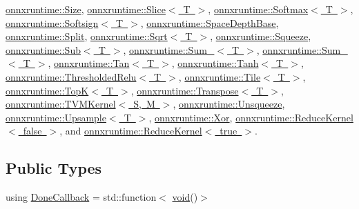 \mbox{\hyperlink{classonnxruntime_1_1Size}{onnxruntime\+::\+Size}}, \mbox{\hyperlink{structonnxruntime_1_1Slice}{onnxruntime\+::\+Slice$<$ T $>$}}, \mbox{\hyperlink{classonnxruntime_1_1Softmax}{onnxruntime\+::\+Softmax$<$ T $>$}}, \mbox{\hyperlink{classonnxruntime_1_1Softsign}{onnxruntime\+::\+Softsign$<$ T $>$}}, \mbox{\hyperlink{classonnxruntime_1_1SpaceDepthBase}{onnxruntime\+::\+Space\+Depth\+Base}}, \mbox{\hyperlink{classonnxruntime_1_1Split}{onnxruntime\+::\+Split}}, \mbox{\hyperlink{classonnxruntime_1_1Sqrt}{onnxruntime\+::\+Sqrt$<$ T $>$}}, \mbox{\hyperlink{classonnxruntime_1_1Squeeze}{onnxruntime\+::\+Squeeze}}, \mbox{\hyperlink{classonnxruntime_1_1Sub}{onnxruntime\+::\+Sub$<$ T $>$}}, \mbox{\hyperlink{classonnxruntime_1_1Sum__6}{onnxruntime\+::\+Sum\+\_$<$ T $>$}}, \mbox{\hyperlink{classonnxruntime_1_1Sum__8}{onnxruntime\+::\+Sum\+\_$<$ T $>$}}, \mbox{\hyperlink{classonnxruntime_1_1Tan}{onnxruntime\+::\+Tan$<$ T $>$}}, \mbox{\hyperlink{classonnxruntime_1_1Tanh}{onnxruntime\+::\+Tanh$<$ T $>$}}, \mbox{\hyperlink{classonnxruntime_1_1ThresholdedRelu}{onnxruntime\+::\+Thresholded\+Relu$<$ T $>$}}, \mbox{\hyperlink{structonnxruntime_1_1Tile}{onnxruntime\+::\+Tile$<$ T $>$}}, \mbox{\hyperlink{classonnxruntime_1_1TopK}{onnxruntime\+::\+Top\+K$<$ T $>$}}, \mbox{\hyperlink{classonnxruntime_1_1Transpose}{onnxruntime\+::\+Transpose$<$ T $>$}}, \mbox{\hyperlink{classonnxruntime_1_1TVMKernel}{onnxruntime\+::\+T\+V\+M\+Kernel$<$ S, M $>$}}, \mbox{\hyperlink{classonnxruntime_1_1Unsqueeze}{onnxruntime\+::\+Unsqueeze}}, \mbox{\hyperlink{classonnxruntime_1_1Upsample}{onnxruntime\+::\+Upsample$<$ T $>$}}, \mbox{\hyperlink{classonnxruntime_1_1Xor}{onnxruntime\+::\+Xor}}, \mbox{\hyperlink{classonnxruntime_1_1ReduceKernel}{onnxruntime\+::\+Reduce\+Kernel$<$ false $>$}}, and \mbox{\hyperlink{classonnxruntime_1_1ReduceKernel}{onnxruntime\+::\+Reduce\+Kernel$<$ true $>$}}.

\subsection*{Public Types}
\begin{DoxyCompactItemize}
\item 
using \mbox{\hyperlink{classonnxruntime_1_1OpKernel_adee0f70567925d90c35b3c5b92ee87ac}{Done\+Callback}} = std\+::function$<$ \mbox{\hyperlink{mlasi_8h_a88f941d423cb2a819b70a1358982b1a6}{void}}()$>$
\end{DoxyCompactItemize}
